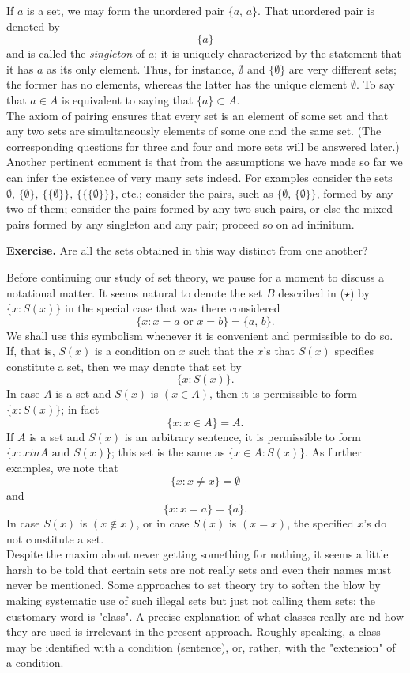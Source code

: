 If $a$ is a set, we may form the unordered pair $\{a, \, a\}$. That unordered pair is denoted by
\[
	\{a\}
\]
and is called the \textit{singleton} of $a$; it is uniquely characterized by the statement that it has $a$ as its only element. Thus, for instance, $\emptyset$ and $\{\emptyset\}$ are very different sets; the former has no elements, whereas the latter has the unique element $\emptyset$. To say that $a \in A$ is equivalent to saying that $\{a\} \subset A$.\\

The axiom of pairing ensures that every set is an element of some set and that any two sets are simultaneously elements of some one and the same set. (The corresponding questions for three and four and more sets will be answered later.) Another pertinent comment is that from the assumptions we have made so far we can infer the existence of very many sets indeed. For examples consider the sets $\emptyset, \, \{\emptyset
\}, \, \{\{\emptyset\}\}, \, \{\{\{\emptyset\}\}\}$, etc.; consider the pairs, such as $\{\emptyset, \, \{\emptyset\}\}$, formed by any two of them; consider the pairs formed by any two such pairs, or else the mixed pairs formed by any singleton and any pair; proceed so on ad infinitum.

\begin{center}
	\textbf{Exercise.} Are all the sets obtained in this way distinct from one another?
\end{center}

Before continuing our study of set theory, we pause for a moment to discuss a notational matter. It seems natural to denote the set $B$ described in ($\star$) by $\{x : S(x)\}$ in the special case that was there considered
\[
	\{x : x = a \text{ or } x = b\} = \{ a, \, b\}.
\]
We shall use this symbolism whenever it is convenient and permissible to do so. If, that is, $S(x)$ is a condition on $x$ such that the $x$'s that $S(x)$ specifies constitute a set, then we may denote that set by
\[
	\{x : S(x)\}.
\]
In case $A$ is a set and $S(x)$ is $(x \in A)$, then it is permissible to form $\{x : S(x)\}$; in fact
\[
	\{x : x \in A\} = A.
\]
If $A$ is a set and $S(x)$ is an arbitrary sentence, it is permissible to form $\{x : x in A \text{ and } S(x)\}$; this set is the same as $\{x \in A : S(x)\}$. As further examples, we note that
\[
	\{x : x \neq x\} = \emptyset
\]
and
\[
	\{x : x = a\} = \{a\}.
\]
In case $S(x)$ is $(x \not \in x)$, or in case $S(x)$ is $(x = x)$, the specified $x$'s do not constitute a set.\\

Despite the maxim about never getting something for nothing, it seems a little harsh to be told that certain sets are not really sets and even their names must never be mentioned. Some approaches to set theory try to soften the blow by making systematic use of such illegal sets but just not calling them sets; the customary word is "class". A precise explanation of what classes really are nd how they are used is irrelevant in the present approach. Roughly speaking, a class may be identified with a condition (sentence), or, rather, with the "extension" of a condition.